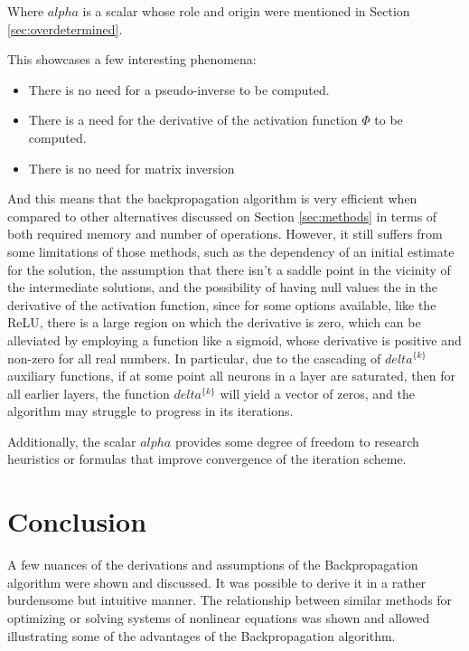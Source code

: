 \documentclass[10pt,journal,compsoc]{IEEEtran}
\newcommand{\cs}[1]{Section \ref{#1}}
\begin{document}
Where $alpha$ is a scalar whose role and origin were mentioned in \cs{sec:overdetermined}.

This showcases a few interesting phenomena:
\begin{itemize}
	\item There is no need for a pseudo-inverse to be computed.
	\item There is a need for the derivative of the activation function $\Phi$ to be computed.
	\item There is no need for matrix inversion
\end{itemize}

And this means that the backpropagation algorithm is very efficient when compared to other alternatives discussed on \cs{sec:methods} in terms of both required memory and number of operations. However, it still suffers from some limitations of those methods, such as the dependency of an initial estimate for the solution, the assumption that there isn't a saddle point in the vicinity of the intermediate solutions, and the possibility of having null values the in the derivative of the activation function, since for some options available, like the ReLU, there is a large region on which the derivative is zero, which can be alleviated by employing a function like a sigmoid, whose derivative is positive and non-zero for all real numbers. In particular, due to the cascading of $delta^{\{ k \}}$ auxiliary functions, if at some point all neurons in a layer are saturated, then for all earlier layers, the function $delta^{\{ k \}}$ will yield a vector of zeros, and the algorithm may struggle to progress in its iterations.

Additionally, the scalar $alpha$ provides some degree of freedom to research heuristics or formulas that improve convergence of the iteration scheme.


\section{Conclusion}

A few nuances of the derivations and assumptions of the Backpropagation algorithm were shown and discussed. It was possible to derive it in a rather burdensome but intuitive manner. The relationship between similar methods for optimizing or solving systems of nonlinear equations was shown and allowed illustrating some of the advantages of the Backpropagation algorithm.
\end{document}

